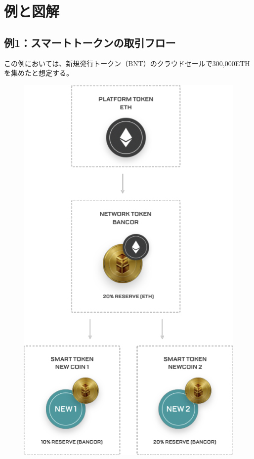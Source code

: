 \documentclass{jsarticle}
\begin{document}
\section{例と図解}

  \subsection{例1：スマートトークンの取引フロー}

  この例においては、新規発行トークン（BNT）のクラウドセールで300,000ETHを集めたと想定する。

  \begin{figure}
    \begin{center}
     \includegraphics[keepaspectratio,scale=0.8]{fig1.png}
    \end{center}
   \end{figure} 
   \noindent
\end{document}
